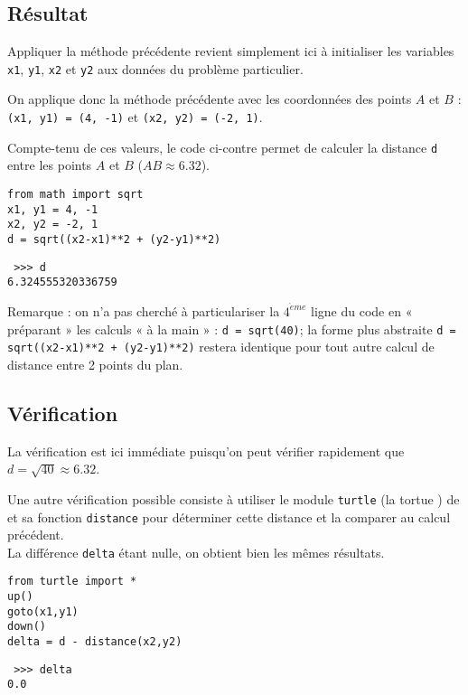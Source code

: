 \subsection{Résultat}\label{affectation:figures:resultat}
Appliquer la méthode précédente revient simplement ici à initialiser les variables
\texttt{x1}, \texttt{y1}, \texttt{x2} et \texttt{y2} aux données du problème particulier.

On applique donc la méthode précédente avec les coordonnées des points $A$ et $B$ :
\texttt{(x1, y1) = (4, -1)} et \texttt{(x2, y2) = (-2, 1)}.

\noindent\begin{minipage}{7cm}
Compte-tenu de ces valeurs, le code \python{} ci-contre
permet de calculer la distance \texttt{d} entre les points
$A$ et $B$ ($AB \approx 6.32$).
\end{minipage}
\hfill
\begin{minipage}{8cm}
\begin{lstlisting}[caption=\textbf{distance entre 2 points}]
from math import sqrt
x1, y1 = 4, -1
x2, y2 = -2, 1
d = sqrt((x2-x1)**2 + (y2-y1)**2)
\end{lstlisting}
\tt\footnotesize
>>> d\\
6.324555320336759
\end{minipage}
\vspace*{2mm}

Remarque : on n'a pas cherché à 
particulariser la $4^{\grave eme}$ ligne du code en « préparant » les calculs
« à la main » : \texttt{d = sqrt(40)};
la forme plus abstraite \texttt{d = sqrt((x2-x1)**2 + (y2-y1)**2)}
restera identique pour tout autre calcul de distance entre 2 points du plan. 

\subsection{Vérification}\label{affectation:figures:verification}
La vérification est ici immédiate puisqu'on peut vérifier rapidement que 
$d = \sqrt{40} \approx 6.32$.


\noindent\begin{minipage}{7cm}
Une autre vérification possible consiste à utiliser le module \texttt{turtle} (la tortue \logo)
de \python{} et sa fonction \texttt{distance} pour déterminer cette distance et 
la comparer au calcul précédent.\\
La différence \texttt{delta} étant nulle, on obtient bien les mêmes résultats.
\end{minipage}
\hfill
\begin{minipage}{8cm}
\begin{lstlisting}
from turtle import *
up()
goto(x1,y1)
down()
delta = d - distance(x2,y2)
\end{lstlisting}
\tt\footnotesize
>>> delta\\
0.0
\end{minipage}
\vspace*{2mm}


